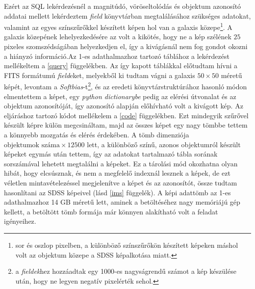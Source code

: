 \documentclass[12pt,letterpaper,oneside,openright]{book}
\begin{document}
 Ezért az SQL lekérdezésnél a magnitúdó, vöröseltolódás és objektum azonosító addatai mellett lekérdeztem \textit{field} könyvtárban megtalálásához szükséges adatokat, valamint az egyes színszűrőkkel készített képen hol van a galaxis közepe\footnote{sor és oszlop pixelben, a különböző színszűrőkön készített képeken  máshol volt az objektum közepe a SDSS képalkotása miatt.}. A galaxis közepének lehelyezkedésére az volt a kikötés, hogy ne a kép szélének $25$ pixeles szomszédságában helyezkedjen el, így a kivágásnál nem fog gondot okozni a hiányzó információ.Az 1-es adathalmazhoz tartozó táblához a lekérdezést mellékeltem a \ref{query} függelékben. Az így kapott táblákkal előtudtam hívni a FITS formátumú \textit{field}eket, melyekből ki tudtam vágni a galaxis $50\times 50$ méretű képét, levontam a \textit{Softbias}-t\footnote{a \textit{fieldek}hez hozzáadtak egy 1000-es nagyságrendű számot a kép készülése után, hogy ne legyen negatív pixelérték sehol.}, és az eredeti könyvtárstruktúrához hasonló módon elmentettem a képet, egy \textit{python dictionarybe} pedig az elérési útvonalat és az objektum azonosítóját, így azonosító alapján előhívható volt a kivágott kép. Az eljáráshoz tartozó kódot mellékelem a \ref{code} függelékben. Ezt mindegyik szűrővel készült képre külön megcsináltam, majd az összes képet egy nagy tömbbe tettem a könnyebb mozgatás és elérés érdekében. A tömb dimenziója $\text{objektumok száma}\times \num{12500}$ lett, a különböző színű, azonos objektumról készült képeket egymás után tettem, így az adatokat tartalmazó tábla sorának sorszámával lehetett megtalálni a képeket. Ez a tárolási mód okozhatna olyan hibát, hogy elcsúsznak, és nem a megfelelő indexnál lesznek a képek, de ezt véletlen mintavételezéssel megjelenítve a képet és az azonosítót, össze tudtam hasonlítani az SDSS képeivel (lásd \ref{ims} függelék). A képi adattömb az 1-es adathalmazhoz 14 GB méretű lett,  aminek a betöltéséhez nagy memóriájú gép kellett, a betöltött tömb formája már könnyen alakítható volt a feladat igényeihez. %
 
 
\end{document}
